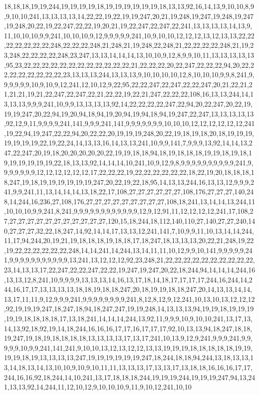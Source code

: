 18,18,18,19,19,244,19,19,19,19,18,19,19,19,19,19,19,18,13,13,92,16,14,13,9,10,10,8,9,9,10,10,241,13,13,13,13,14,22,22,19,22,19,19,247,20,21,19,248,19,247,19,248,19,247,19,248,20,22,19,22,247,22,22,19,20,21,19,22,247,22,247,22,241,13,13,13,13,14,13,9,11,10,10,10,9,9,241,10,10,10,9,12,9,9,9,9,9,241,10,9,10,10,12,12,12,13,12,13,13,22,22,22,22,22,22,22,248,22,22,22,248,21,248,21,19,248,22,248,21,22,22,22,22,248,21,19,23,248,22,22,22,22,248,23,247,13,13,14,14,14,13,10,10,9,12,8,9,9,10,11,13,13,13,13,13,95,23,22,22,22,22,22,22,22,22,22,22,22,22,21,22,22,22,20,22,247,22,22,22,94,20,22,22,22,22,22,22,22,22,23,13,13,13,244,13,13,13,9,10,10,10,10,12,8,10,10,10,9,9,8,241,9,9,9,9,9,9,10,9,10,9,12,241,12,10,12,9,22,95,22,22,247,22,247,22,22,247,20,21,22,21,21,21,21,19,21,22,247,22,247,22,21,22,22,19,22,21,247,22,22,22,108,16,13,13,244,14,13,13,13,9,9,9,241,10,9,9,13,13,13,13,92,14,22,22,22,22,247,22,94,20,22,247,20,22,19,19,19,247,20,22,94,19,20,94,18,94,19,20,94,19,94,18,94,19,247,22,247,13,13,13,13,13,92,12,9,11,9,9,9,9,241,141,9,9,9,241,141,9,9,9,9,9,9,9,10,10,10,12,12,12,12,12,12,241,19,22,94,19,247,22,22,94,20,22,22,20,19,19,19,248,20,22,19,18,19,18,20,18,19,19,19,19,19,19,19,22,19,22,24,14,13,13,16,14,13,13,241,10,9,9,141,7,9,9,9,13,92,14,14,13,247,22,247,20,19,18,20,20,20,20,20,22,19,19,18,18,94,18,19,18,18,18,19,19,18,19,18,19,19,19,19,19,19,22,18,13,13,92,14,14,14,10,241,10,9,12,9,8,9,9,9,9,9,9,9,9,9,9,241,9,9,9,9,9,9,9,12,12,12,12,12,12,17,22,22,22,19,22,22,22,22,22,22,18,22,19,20,18,18,18,18,247,19,18,19,19,19,19,19,19,247,20,22,19,22,18,95,14,13,13,244,16,13,13,12,9,9,9,241,9,9,241,11,13,14,14,14,13,18,22,17,108,27,27,27,27,27,27,108,176,27,27,27,140,248,14,244,16,236,27,108,176,27,27,27,27,27,27,27,27,27,108,18,241,13,14,14,13,244,11,10,10,10,9,9,241,8,241,9,9,9,9,9,9,9,9,9,9,9,9,12,9,12,91,11,12,12,12,12,241,17,108,27,27,27,27,27,27,27,27,27,27,27,27,120,15,18,244,18,112,140,110,27,140,27,27,240,140,27,27,27,32,22,18,247,14,92,14,14,17,13,13,12,241,141,7,10,9,9,11,10,13,14,14,244,11,17,94,244,20,19,21,19,18,18,18,19,18,18,17,18,247,18,13,13,13,20,22,21,248,19,22,19,22,22,22,22,22,22,248,14,14,241,14,244,13,14,11,11,10,12,9,9,10,141,9,9,9,9,9,241,9,9,9,9,9,9,9,9,9,9,9,13,241,13,12,12,12,92,23,248,21,22,22,22,22,22,22,22,22,22,22,23,14,13,13,17,22,247,22,22,247,22,22,19,247,19,247,20,22,18,244,94,14,14,14,244,16,13,13,12,8,241,10,9,9,9,9,13,13,13,14,16,13,17,18,14,18,17,17,17,17,244,16,244,14,244,16,17,17,13,13,13,13,18,18,19,18,18,247,20,18,19,19,18,18,247,20,14,13,13,14,14,13,17,11,11,9,12,9,9,9,241,9,9,9,9,9,9,9,9,241,8,12,8,12,9,12,241,10,13,10,13,12,12,12,92,19,19,19,247,18,247,18,94,18,247,247,19,19,248,14,13,13,13,94,19,19,18,19,19,19,19,19,18,18,18,18,17,13,18,241,14,14,14,244,13,92,11,9,9,9,10,9,10,10,241,13,17,13,14,13,92,18,92,19,14,18,244,16,16,16,17,17,16,17,17,17,92,10,13,13,94,18,247,18,18,19,247,19,18,19,18,18,18,18,13,13,13,13,17,13,17,241,10,13,9,12,9,241,9,9,9,241,9,9,9,9,9,10,9,9,241,141,241,9,10,10,13,12,13,12,12,13,13,19,19,19,18,18,18,18,18,19,19,19,19,18,19,13,13,13,13,247,19,19,19,19,19,19,247,18,244,18,18,94,244,13,18,13,13,13,14,18,13,14,13,10,10,9,10,9,10,11,11,13,13,13,17,13,13,17,13,18,18,16,16,16,17,17,244,16,16,92,18,244,14,10,241,13,17,18,18,18,244,19,19,19,244,19,19,19,247,94,13,241,13,13,92,14,244,11,12,10,12,9,10,10,10,9,11,9,10,12,241,10,10